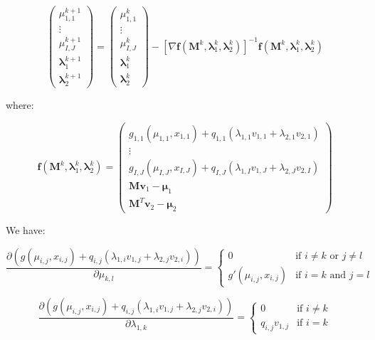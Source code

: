 \documentclass{tex/note}
\begin{document}
\begin{equation*}
\begin{pmatrix} \mu_{1,1}^{k + 1} \\ \vdots \\ \mu_{I,J}^{k + 1} \\ \bm{\lambda}_1^{k + 1} \\ \bm{\lambda}_2^{k + 1} \end{pmatrix} = \begin{pmatrix} \mu_{1,1}^k \\ \vdots \\ \mu_{I,J}^k \\ \bm{\lambda}_1^k \\ \bm{\lambda}_2^k \end{pmatrix} - \left[ \nabla \bm{f} \left( \bm{M}^k , \bm{\lambda}_1^k , \bm{\lambda}_2^k \right) \right] ^{-1} \bm{f} \left( \bm{M}^k , \bm{\lambda}_1^k , \bm{\lambda}_2^k \right)
\end{equation*}

where:

\begin{equation*}
\bm{f} \left( \bm{M}^k , \bm{\lambda}_1^k , \bm{\lambda}_2^k \right) = \begin{pmatrix} g_{1,1} \left( \mu_{1,1} , x_{1,1} \right) + q_{1,1} \left( \lambda_{1,1} v_{1,1} + \lambda_{2,1} v_{2,1} \right) \\ \vdots \\ g_{I,J} \left( \mu_{I,J} , x_{I,J} \right) + q_{I,J} \left( \lambda_{1,I} v_{1,J} + \lambda_{2,J} v_{2,I} \right) \\ \bm{M} \bm{v}_1 - \bm{\mu}_1 \\ \bm{M}^T \bm{v}_2 - \bm{\mu}_2 \end{pmatrix}
\end{equation*}

We have:

\begin{equation*}
\frac{\partial \left( g \left( \mu_{i,j} , x_{i,j} \right) + q_{i,j} \left( \lambda_{1,i} v_{1,j} + \lambda_{2,j} v_{2,i} \right) \right)}{\partial \mu_{k,l}} =
\begin{cases}
0 & \text{if } i \neq k \text{ or } j \neq l \\
g' \left( \mu_{i,j} , x_{i,j} \right) & \text{if } i = k \text{ and } j = l
\end{cases}
\end{equation*}

\begin{equation*}
\frac{\partial \left( g \left( \mu_{i,j} , x_{i,j} \right) + q_{i,j} \left( \lambda_{1,i} v_{1,j} + \lambda_{2,j} v_{2,i} \right) \right)}{\partial \lambda_{1,k}} =
\begin{cases}
0 & \text{if } i \neq k \\
q_{i,j} v_{1,j} & \text{if } i = k
\end{cases}
\end{equation*}
\end{document}

